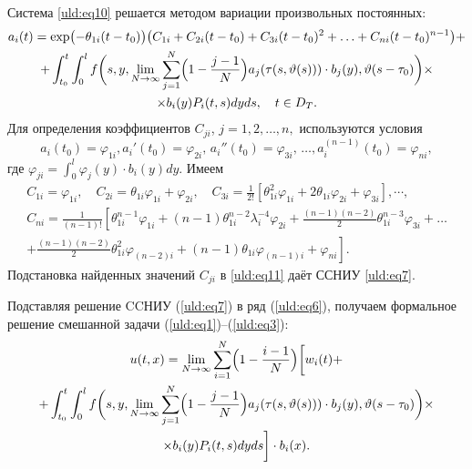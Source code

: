 Система \eqref{uld:eq10} решается методом вариации произвольных постоянных:
\begin{multline}
\label{uld:eq11}
a_i (t)= \exp  \bigl(  -\theta _{  1 i} (t-t_0)\bigr) \bigl( C_{1 i} + C_{2 i} (t-t_0)+C_{3 i} (t-t_0)^2 +  \ldots +C_{n i}
(t-t_0)^{ n-1}\bigr) 
+
\\
+\int_{t_0}^t
\int_0^l f \biggl(s,y,\lim \limits_{N\to \infty } \sum \limits_{j =1}^N \Bigl( 1-\frac{j-1}{N}\Bigr)
a_j ( \tau  (s , \vartheta  (s))) \cdot b_j (y) , \vartheta  (s-\tau _0) \biggr)\times
\\
\times b_i ( y ) P_i (t , s) dy ds, \quad t\in D_T.
\end{multline}
Для определения коэффициентов $C_{j i}$, $j=1, 2, \dots, n,$
используются условия
\[
a_i  (t_0)=\varphi _{1 i} , a_i'(t_0)=\varphi
_{ 2 i },\,a_i''(t_0)=\varphi _{3 i},\,
\ldots , a_i^{(n-1)} (t_0)=\varphi
_{n i},
\]
где $\displaystyle \varphi_{j i} =\int_0^l \varphi_j (y) \cdot b
_i(y)dy$. Имеем
\begin{gather*}
C_{1 i} =\varphi _{1 i},
\quad 
C_{ 2 i} =\theta _{ 1 i} \varphi _{ 1 i} +\varphi _{ 2 i},
\quad 
C_{ 3 i} =\frac{1}{2 !}\left[  \theta _{ 1 i}^2  \varphi _{ 1
i} + 2 \theta _{1 i}  \varphi _{2 i} + \varphi _{ 3 i}
\right],
\cdots,
\\
C_{ n i} =\frac{1}{(n-1)!}  \left[ \theta _{1 i}^{ n-1}
 \varphi _{ 1 i} +(n-1)  \theta _{ 1 i}^{ n-2} \lambda
_i^{ -4} \varphi _{2 i} +   \frac{(n-1) (n-2)}{2} \theta _{
 1 i}^{ n-3}  \varphi _{ 3 i} + \ldots
\right.
\\
\left. +\frac{(n-1) (n-2)}{2} \theta _{1 i}^2  \varphi _{
(n-2) i}  +(n-1)  \theta _{1 i}  \varphi _{ (n-1) i}
+\varphi _{ n i} \right].
\end{gather*}
Подстановка найденных значений $C_{ j i }$ 
в \eqref{uld:eq11} даёт ССНИУ \eqref{uld:eq7}.

Подставляя решение CCНИУ (\ref{uld:eq7}) в ряд (\ref{uld:eq6}), получаем формальное решение
смешанной задачи (\ref{uld:eq1})--(\ref{uld:eq3}):
\begin{multline}
\label{uld:eq12}
u (t, x )=\lim \limits_{N\to \infty } \sum\limits_{i
=1}^N \Bigl( 1-\frac{i-1}{N}\Bigr) \biggl[ w_i  (t)+
\\
+\int_{t_0}^t \int_0^l f \biggl( s, y, \lim \limits_{N \to \infty } \sum\limits_{j =1}^N \Bigl( 1-\frac{j-1}{N}\Bigr)
a_j(\tau (s,\vartheta (s)))\cdot b_j (y), \vartheta (s-\tau_0) \biggr) \times
\\
\times b_i (y) P_i (t,  s) dy ds \biggr] \cdot b_i( x ).
\end{multline}

